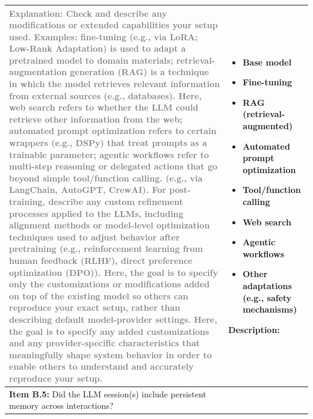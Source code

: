 \documentclass[12pt]{article}
\newcommand{\unchecked}{\ding{111}} %
\begin{document}
\begin{longtable}{|p{}|p{}|}
\textcolor{gray}{{\footnotesize
\textbf{Explanation:} Check and describe any modifications or extended capabilities your setup used. Examples: fine-tuning (e.g., via LoRA; Low-Rank Adaptation) is used to adapt a pretrained model to domain materials; retrieval-augmentation generation (RAG) is a technique in which the model retrieves relevant information from external sources (e.g., databases). Here, web search refers to whether the LLM could retrieve other information from the web; automated prompt optimization refers to certain wrappers (e.g., DSPy) that treat prompts as a trainable parameter; agentic workflows refer to multi-step reasoning or delegated actions that go beyond simple tool/function calling. (e.g., via LangChain, AutoGPT, CrewAI). For post-training, describe any custom refinement processes applied to the LLMs, including alignment methods or model-level optimization techniques used to adjust behavior after pretraining (e.g., reinforcement learning from human feedback (RLHF), direct preference optimization (DPO)). Here, the goal is to specify only the customizations or modifications added on top of the existing model so others can reproduce your exact setup, rather than describing default model-provider settings. Here, the goal is to specify any added customizations and any provider-specific characteristics that meaningfully shape system behavior in order to enable others to understand and accurately reproduce your setup. }}  &   \begin{itemize}[leftmargin=*]\setlength{\itemsep}{0pt}\setlength{\parskip}{0pt}
   \item[\unchecked] Base model
   \item[\unchecked] Fine-tuning
   \item[\unchecked] RAG (retrieval-augmented)
   \item[\unchecked] Automated prompt optimization
   \item[\unchecked] Tool/function calling
   \item[\unchecked] Web search
   \item[\unchecked] Agentic workflows
   \item[\unchecked] Other adaptations (e.g., safety mechanisms)
\end{itemize}

Description: \\
\hline
\textbf{Item B.5:} Did the LLM session(s) include persistent memory across interactions?


\end{longtable}
\end{document}
